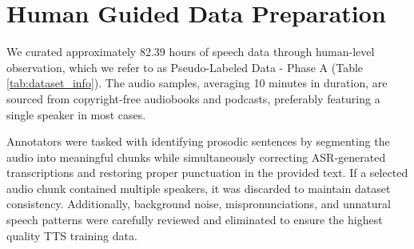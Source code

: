 





\section{Human Guided Data Preparation}
\label{app:human_reviewed_data}
We curated approximately 82.39 hours of speech data through human-level observation, which we refer to as Pseudo-Labeled Data - Phase A (Table \ref{tab:dataset_info}). The audio samples, averaging 10 minutes in duration, are sourced from copyright-free audiobooks and podcasts, preferably featuring a single speaker in most cases.

Annotators were tasked with identifying prosodic sentences by segmenting the audio into meaningful chunks while simultaneously correcting ASR-generated transcriptions and restoring proper punctuation in the provided text. If a selected audio chunk contained multiple speakers, it was discarded to maintain dataset consistency. Additionally, background noise, mispronunciations, and unnatural speech patterns were carefully reviewed and eliminated to ensure the highest quality TTS training data.
